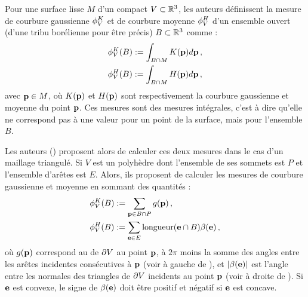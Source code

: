 Pour une surface lisse $M$ d'un compact $V \subset \mathbb{R}^3$, les auteurs
définissent la mesure de courbure gaussienne $\phi^{K}_V$ et de
courbure moyenne $\phi^{H}_V$ d'un ensemble ouvert (d'une tribu
borélienne pour être précis) $B \subset \mathbb{R}^3$ comme :
%
\begin{align}
  &\phi^{K}_V(B) := \int_{B \cap M} K(\mathbf{p}) d\mathbf{p} \,,\\
  &\phi^{H}_V(B)  := \int_{B \cap M} H(\mathbf{p})  d\mathbf{p} \,,
\end{align}
%
avec $\mathbf{p} \in M$, où $K(\mathbf{p})$ et $H(\mathbf{p})$ sont respectivement
la courbure gaussienne et moyenne du point $\mathbf{p}$. Ces mesures sont des mesures
intégrales, c'est à dire qu'elle ne correspond pas à une valeur pour un point de
la surface, mais pour l'ensemble $B$.


Les auteurs () proposent alors de calculer ces deux
mesures dans le cas d'un maillage triangulé. Si $V$ est un polyhèdre dont
l'ensemble de ses sommets est $P$ et l'ensemble d'arêtes est $E$. Alors, ils
proposent de calculer les mesures de courbure gaussienne et moyenne en sommant
des quantités :
%
\begin{align}
  &\phi^{K}_V(B) := \sum_{\mathbf{p} \in B \cap P} g(\mathbf{p}) \,,\\
  &\phi^{H}_V(B)  := \sum_{\mathbf{e} \in E} \text{longueur}(\mathbf{e} \cap B) \beta(\mathbf{e}) \,,
\end{align}
%
où $g(\mathbf{p})$ correspond au  de $\partial V$ au point
$\mathbf{p}$, \cad à $2\pi$ moins la somme des angles entre les arêtes incidentes
consécutives à $\mathbf{p}$  (voir à gauche de ), et
$|\beta(\mathbf{e})|$ est l'angle entre les normales des triangles de $\partial V$
incidents au point $\mathbf{p}$ (voir à droite de ). Si
$\mathbf{e}$ est convexe, le signe de $\beta(\mathbf{e})$ doit être positif et négatif si
$\mathbf{e}$ est concave.


